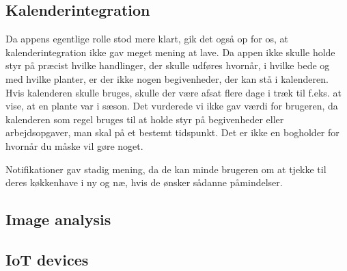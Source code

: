 \subsection{Kalenderintegration}
Da appens egentlige rolle stod mere klart, gik det også op for os, at kalenderintegration ikke gav meget mening at lave. Da appen ikke skulle holde styr på præcist hvilke handlinger, der skulle udføres hvornår, i hvilke bede og med hvilke planter, er der ikke nogen begivenheder, der kan stå i kalenderen. Hvis kalenderen skulle bruges, skulle der være afsat flere dage i træk til f.eks. at vise, at en plante var i sæson. Det vurderede vi ikke gav værdi for brugeren, da kalenderen som regel bruges til at holde styr på begivenheder eller arbejdsopgaver, man skal på et bestemt tidspunkt. Det er ikke en bogholder for hvornår du måske vil gøre noget.

Notifikationer gav stadig mening, da de kan minde brugeren om at tjekke til deres køkkenhave i ny og næ, hvis de ønsker sådanne påmindelser.

\subsection{Image analysis}

\subsection{IoT devices}


